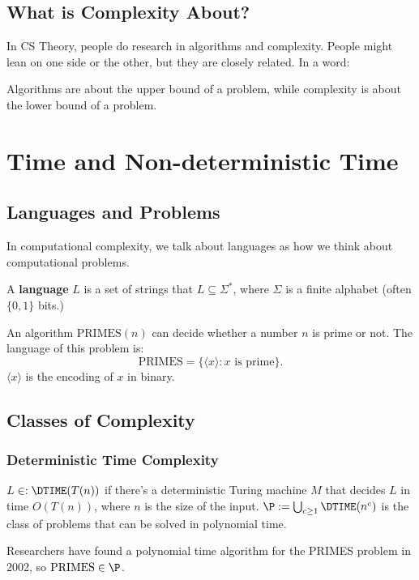 \section{What is Complexity About?}

In CS Theory, people do research in algorithms and complexity. People might lean on one side or the other, but they are closely related. In a word:
\begin{remark}
	Algorithms are about the upper bound of a problem, while complexity is about the lower bound of a problem.
\end{remark}

\chapter{Time and Non-deterministic Time}

\section{Languages and Problems}
In computational complexity, we talk about languages as how we think about computational problems.

\begin{definition}
	A \textbf{language} $L$ is a set of strings that $L\subseteq \Sigma^*$, where $\Sigma$ is a finite alphabet (often $\{0,1\}$ bits.)
\end{definition}

\begin{eg}
	An algorithm $\text{PRIMES}(n)$ can decide whether a number $n$ is prime or not. The language of this problem is:
	\[ \text{PRIMES} = \{ \langle x \rangle : x \text{ is prime} \}. \]
	$\langle x \rangle$ is the encoding of $x$ in binary.
\end{eg}

\section{Classes of Complexity}

\subsection{Deterministic Time Complexity}
\begin{definition}
	$L \in : \DTIME(T(n))$ if there's a deterministic Turing machine $M$ that decides $L$ in time $O(T(n))$, where $n$ is the size of the input.
	$ \P := \bigcup_{c\ge 1} \DTIME(n^c)$ is the class of problems that can be solved in polynomial time.
\end{definition}

Researchers have found a polynomial time algorithm for the PRIMES problem in 2002, so $\text{PRIMES}\in \P$.
